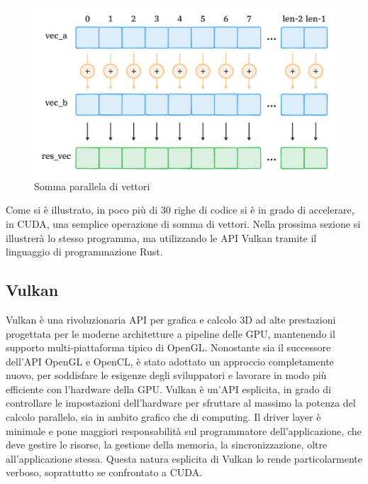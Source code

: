 \begin{figure}[ht]
    \centering
    \includegraphics[width=.9\linewidth]{images/chapter2/sum_vec.png}
    \caption{Somma parallela di vettori}
    \label{fig:sum_vec}
\end{figure}

Come si è illustrato, in poco più di 30 righe di codice si è in grado di accelerare, in CUDA, una semplice operazione di somma di vettori. Nella prossima sezione si illustrerà lo stesso programma, ma utilizzando le API Vulkan tramite il linguaggio di programmazione Rust.

\subsection[Vulkan]{Vulkan}

Vulkan è una rivoluzionaria API per grafica e calcolo 3D ad alte prestazioni progettata per le moderne architetture a pipeline delle GPU, mantenendo il supporto multi-piattaforma tipico di OpenGL. Nonostante sia il successore dell'API OpenGL e OpenCL, è stato adottato un approccio completamente nuovo, per soddisfare le esigenze degli sviluppatori e lavorare in modo più efficiente con l'hardware della GPU. Vulkan è un'API esplicita, in grado di controllare le impostazioni dell'hardware per sfruttare al massimo la potenza del calcolo parallelo, sia in ambito grafico che di computing. Il driver layer è minimale e pone maggiori responsabilità sul programmatore dell'applicazione, che deve gestire le risorse, la gestione della memoria, la sincronizzazione, oltre all'applicazione stessa. Questa natura esplicita di Vulkan lo rende particolarmente verboso, soprattutto se confrontato a CUDA.

